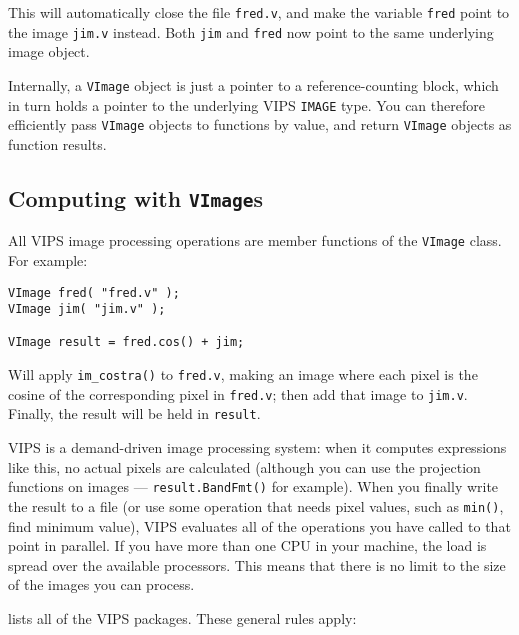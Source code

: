 This will automatically close the file \verb+fred.v+, and make the variable
\verb+fred+ point to the image \verb+jim.v+ instead. Both \verb+jim+ and
\verb+fred+ now point to the same underlying image object. 

Internally, a \verb+VImage+ object is just a pointer to a reference-counting
block, which in turn holds a pointer to the underlying VIPS \verb+IMAGE+ type.
You can therefore efficiently pass \verb+VImage+ objects to functions by
value, and return \verb+VImage+ objects as function results.

\subsection{Computing with \texttt{VImage}s}
\label{sec:compute}

All VIPS image processing operations are member functions of the \verb+VImage+
class. For example:

\begin{verbatim}
VImage fred( "fred.v" );
VImage jim( "jim.v" );

VImage result = fred.cos() + jim;
\end{verbatim}

Will apply \verb+im_costra()+ to \verb+fred.v+, making an image where each
pixel is the cosine of the corresponding pixel in \verb+fred.v+; then add that
image to \verb+jim.v+. Finally, the result will be held in \verb+result+.

VIPS is a demand-driven image processing system: when it computes expressions
like this, no actual pixels are calculated (although you can use the
projection functions on images --- \verb+result.BandFmt()+ for example).  When
you finally write the result to a file (or use some operation that needs pixel
values, such as \verb+min()+, find minimum value), VIPS evaluates all of the
operations you have called to that point in parallel. If you have more than one
CPU in your machine, the load is spread over the available processors. This
means that there is no limit to the size of the images you can process.

 lists all of the VIPS packages. These general
rules apply:


